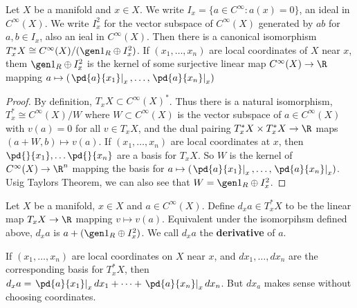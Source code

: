 \begin{nprop}
   Let $X$ be a manifold and $x \in X$. We write $I_x = \{a \in C^\infty : a(x) = 0\}$, an ideal in $C^\infty(X)$. We write $I_x^2$ for the vector subspace of $C^\infty(X)$ generated by $ab$ for $a,b  \in I_x$, also an ieal in $C^\infty(X)$. Then there is a canonical isomorphism $T_x^*X \cong C^\infty(X) / (\gen 1 _R \oplus I_x^2)$. If $(x_1, \dots, x_n)$ are local coordinates of $X$ near $x$, them $\gen 1_R \oplus I_x^2$ is the kernel of some surjective linear map
   $C^\infty(X) \to \R$ mapping $a \mapsto \left(\left.\pd{a}{x_1}\right|_x, \dots, \left.\pd{a}{x_n}\right|_x\right)$
\end{nprop}
\begin{proof}
  By definition, $T_xX \subset C^\infty(X)^*$. Thus there is a natural isomorphism, $T_x^* \cong C^\infty(X)/W$ where $W \subset C^\infty(X)$ is the vector subspace of $a \in C^\infty(X)$ with $v(a) = 0$ for all $v \in T_xX$, and the dual pairing $T_x^*X \times T_x^*X \to \R$ maps $(a + W, b) \mapsto v(a)$. If $(x_1, \dots, x_n)$ are local coordinates at $x$, then $\pd{}{x_1}, \dots \pd{}{x_n}$ are a basis for $T_xX$.
  So $W$ is the kernel of $C^\infty(X) \to \R^n$ mapping the basis for $a \mapsto \left(\left.\pd{a}{x_1}\right|_x, \dots, \left.\pd{a}{x_n}\right|_x\right)$. Usig Taylors Theorem, we can also see that $W = \gen 1_R \oplus I_x^2$.
\end{proof}

\begin{ndefi}[Derivative]
  Let $X$ be a manifold, $x \in X$ and $a \in C^\infty (X)$. Define $d_xa \in T_x^*X$ to be the linear map $T_xX \to \R$ mapping $v \mapsto v(a)$. Equivalent under the isomorpihsm defined above, $d_xa $ is $a + (\gen 1_R \oplus I_x^2)$. We call $d_xa$ the \textbf{derivative} of $a$.
\end{ndefi}

\noindent
If $(x_1, \dots, x_n)$ are local coordinates on $X$ near $x$, and $dx_1, \dots, dx_n$ are the corresponding basis for $T_x^*X$, then $d_xa = \left.\pd{a}{x_1}\right|_x dx_1 + \dots + \left. \pd{a}{x_n}\right|_x dx_n$. But $dx_a$ makes sense without choosing coordinates.